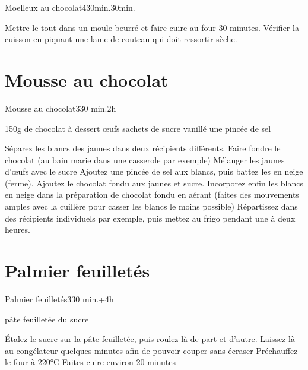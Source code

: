 {\begin{recette}{Moelleux au chocolat}{4}{30min.}{30min.}
\begin{cuisson}
Mettre le tout dans un moule beurré et faire cuire au four 30 minutes. Vérifier la cuisson en piquant une lame de couteau qui doit ressortir sèche. 
\end{cuisson}
\end{recette}

\section{Mousse au chocolat}
\begin{recette}{Mousse au chocolat}{3}{30 min.}{2h}
\begin{ingredients}[4 personnes]
\ingredient 150g de chocolat à dessert
 œufs
 sachets de sucre vanillé
\ingredient une pincée de sel
\end{ingredients}

\begin{preparation}
\etape Séparez les blancs des jaunes dans deux récipients différents.
\etape Faire fondre le chocolat (au bain marie dans une casserole par exemple)
\etape Mélanger les jaunes d'œufs avec le sucre
\etape Ajoutez une pincée de sel aux blancs, puis battez les en neige (ferme).
\etape Ajoutez le chocolat fondu aux jaunes et sucre.
\etape Incorporez enfin les blancs en neige dans la préparation de chocolat fondu en aérant (faites des mouvements amples avec 
la cuillère pour casser les blancs le moins possible)
\etape Répartissez dans des récipients individuels par exemple, puis mettez au frigo pendant une à deux heures.
\end{preparation}
\end{recette}


\section{Palmier feuilletés}
\begin{recette}{Palmier feuilletés}{3}{30 min.+4h}{}
\begin{ingredients}
 pâte feuilletée
\ingredient du sucre
\end{ingredients}

\begin{preparation}
\etape Étalez le sucre sur la pâte feuilletée, puis roulez là de part et d'autre. 
\etape Laissez là au congélateur quelques minutes afin de pouvoir couper sans écraser
\etape Préchauffez le four à 220°C
\etape Faites cuire environ 20 minutes
\end{preparation}
\end{recette}

}
